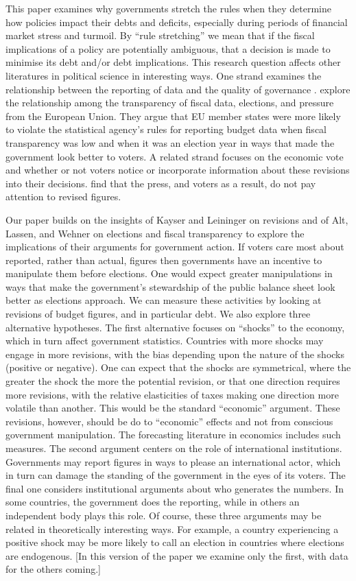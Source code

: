 \documentclass[]{article}
\begin{document}
This paper examines why governments stretch the rules when they determine how policies impact their debts and deficits, especially during periods of financial market stress and turmoil. By ``rule stretching'' we mean that if the fiscal implications of a policy are potentially ambiguous, that a decision is made to minimise its debt and/or debt implications. This research question affects other literatures in political science in interesting ways. One strand examines the relationship between the reporting of data and the quality of governance \cite[e.g.][]{Hollyer2014}. \cite{Alt2014} explore the relationship among the transparency of fiscal data, elections, and pressure from the European Union. They argue that EU member states were more likely to violate the statistical agency's rules for reporting budget data when fiscal transparency was low and when it was an election year in ways that made the government look better to voters. A related strand focuses on the economic vote and whether or not voters notice or incorporate information about these revisions into their decisions. \cite{KayserLeininger2015} find that the press, and voters as a result, do not pay attention to revised figures.

Our paper builds on the insights of Kayser and Leininger on revisions and of Alt, Lassen, and Wehner on elections and fiscal transparency to explore the implications of their arguments for government action. If voters care most about reported, rather than actual, figures then governments have an incentive to manipulate them before elections. One would expect greater manipulations in ways that make the government's stewardship of the public balance sheet look better as elections approach. We can measure these activities by looking at revisions of budget figures, and in particular debt. We also explore three alternative hypotheses. The first alternative focuses on ``shocks'' to the economy, which in turn affect government statistics. Countries with more shocks may engage in more revisions, with the bias depending upon the nature of the shocks (positive or negative). One can expect that the shocks are symmetrical, where the greater the shock the more the potential revision, or that one direction requires more revisions, with  the relative elasticities of taxes making one direction more volatile than another. This would be the standard ``economic'' argument. These revisions, however, should be do to ``economic'' effects and not from conscious government manipulation. The forecasting literature in economics includes such measures. The second argument centers on the role of international institutions. Governments may report figures in ways to please an international actor, which in turn can damage the standing of the government in the eyes of its voters. The final one considers institutional arguments about who generates the numbers. In some countries, the government does the reporting, while in others an independent body plays this role.  Of course, these three arguments may be related in theoretically interesting ways. For example, a country experiencing a positive shock may be more likely to call an election in countries where elections are endogenous. [In this version of the paper we examine only the first, with data for the others coming.]
\end{document}

